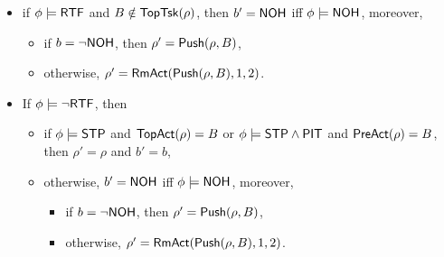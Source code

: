 {\begin{itemize}
\begin{itemize}
\begin{itemize}
			\end{itemize}
			\item if $\phi \models {\sf RTF}$ and $B \notin \mathsf{TopTsk}(\rho)$, then $b' = {\sf NOH}$ iff $\phi \models {\sf NOH}$, moreover,
			\begin{itemize}
				\item if $b = \neg {\sf NOH}$, then $\rho' = \mathsf{Push}(\rho, B)$, 
				\item otherwise, $\rho' = \mathsf{RmAct}( \mathsf{Push}(\rho, B), 1, 2)$. 
			\end{itemize}
			\item If $\phi \models \neg {\sf RTF}$, then
			\begin{itemize}
				\item if $\phi \models {\sf STP}$ and $\mathsf{TopAct}(\rho) = B$ or $\phi \models {\sf STP}\wedge{\sf PIT}$ and $\mathsf{PreAct}(\rho) = B$, then $\rho' = \rho$ and $b' = b$,
				\item otherwise, $b' = {\sf NOH}$ iff $\phi \models {\sf NOH}$, moreover,
				\begin{itemize}
					\item if $b = \neg {\sf NOH}$, then $\rho' = \mathsf{Push}(\rho, B)$, 
					\item otherwise, $\rho' = \mathsf{RmAct}( \mathsf{Push}(\rho, B), 1, 2)$. 
				\end{itemize}
			\end{itemize}
		\end{itemize}
\end{itemize}

\smallskip
\noindent \fbox{$\phi \models \ndmflag$}

}
